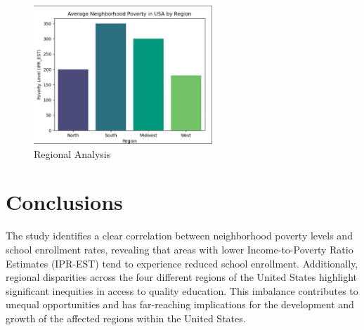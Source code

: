 \documentclass[a4paper,11pt]{article}
\begin{document}
\begin{figure}[h]
    \centering
    \includegraphics[width=0.6\textwidth]{images/Regional-Analysis.png}
    \caption{Regional Analysis}
    \label{fig:sea_levels}
\end{figure}
\vspace{10cm}


\section*{Conclusions}

The study identifies a clear correlation between neighborhood poverty levels and school enrollment rates, revealing that areas with lower Income-to-Poverty Ratio Estimates (IPR-EST) tend to experience reduced school enrollment. Additionally, regional disparities across the four different regions of the United States highlight significant inequities in access to quality education. This imbalance contributes to unequal opportunities and has far-reaching implications for the development and growth of the affected regions within the United States.




\end{document}
